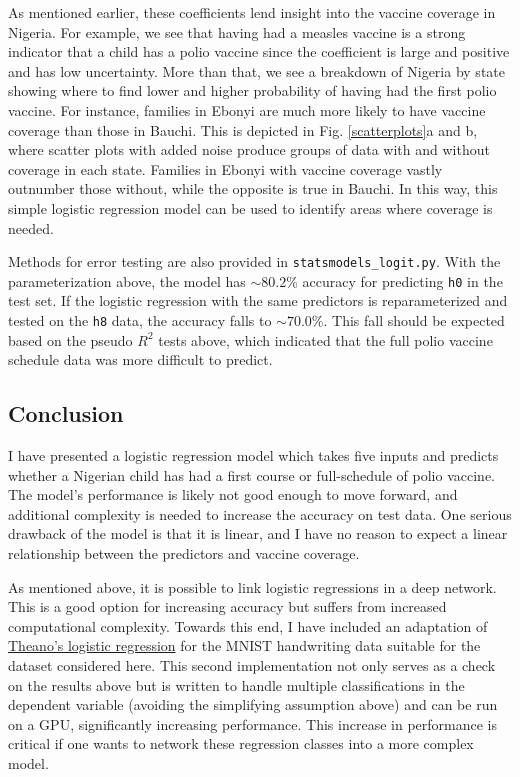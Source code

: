 \documentclass[prl,onecolumn,amsmath,amssymb,superscriptaddress,notitlepage]{revtex4-1}
\begin{document}
As mentioned earlier, these coefficients lend insight into the vaccine coverage in Nigeria. For example, we see that having had a measles vaccine is a strong indicator that a child has a polio vaccine since the coefficient is large and positive and has low uncertainty. More than that, we see a breakdown of Nigeria by state showing where to find lower and higher probability of having had the first polio vaccine. For instance, families in Ebonyi are much more likely to have vaccine coverage than those in Bauchi. This is depicted in Fig. \ref{scatterplots}a and b, where scatter plots with added noise produce groups of data with and without coverage in each state. Families in Ebonyi with vaccine coverage vastly outnumber those without, while the opposite is true in Bauchi. In this way, this simple logistic regression model can be used to identify areas where coverage is needed. 

Methods for error testing are also provided in \verb|statsmodels_logit.py|. With the parameterization above, the model has $\sim 80.2\%$ accuracy for predicting \verb|h0| in the test set. If the logistic regression with the same predictors is reparameterized and tested on the \verb|h8| data, the accuracy falls to $\sim 70.0\%$. This fall should be expected based on the pseudo $R^2$ tests above, which indicated that the full polio vaccine schedule data was more difficult to predict.

\subsection{Conclusion}

I have presented a logistic regression model which takes five inputs and predicts whether a Nigerian child has had a first course or full-schedule of polio vaccine. The model's performance is likely not good enough to move forward, and additional complexity is needed to increase the accuracy on test data. One serious drawback of the model is that it is linear, and I have no reason to expect a linear relationship between the predictors and vaccine coverage. 

As mentioned above, it is possible to link logistic regressions in a deep network. This is a good option for increasing accuracy but suffers from increased computational complexity. Towards this end, I have included an adaptation of \href{http://deeplearning.net/tutorial/logreg.html}{Theano's logistic regression} for the MNIST handwriting data suitable for the dataset considered here. This second implementation not only serves as a check on the results above but is written to handle multiple classifications in the dependent variable (avoiding the simplifying assumption above) and can be run on a GPU, significantly increasing performance. This increase in performance is critical if one wants to network these regression classes into a more complex model. 
\end{document}
